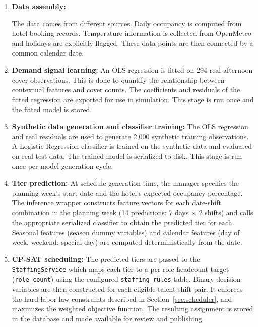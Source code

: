 \documentclass[12pt,a4paper,oneside]{article}
\begin{document}
\begin{enumerate}
    \item \textbf{Data assembly:} 
    
    The data comes from different sources. Daily occupancy is computed from hotel booking records. Temperature information is collected from OpenMeteo and holidays are explicitly flagged. These data points are then connected by a common calendar date. 

    \item \textbf{Demand signal learning:} An OLS regression is fitted on 294 real afternoon cover observations. This is done to quantify the relationship between contextual features and cover counts. The coefficients and residuals of the fitted regression are exported for use in simulation. This stage is run once and the fitted model is stored.

    \item \textbf{Synthetic data generation and classifier training:} The OLS regression and real residuals are used to generate 2,000 synthetic training observations. A Logistic Regression classifier is trained on the synthetic data and evaluated on real test data. The trained model is serialized to disk. This stage is run once per model generation cycle.

    \item \textbf{Tier prediction:} At schedule generation time, the manager specifies the planning week's start date and the hotel's expected occupancy percentage. The inference wrapper constructs feature vectors for each date-shift combination in the planning week (14 predictions: 7 days $\times$ 2 shifts) and calls the appropriate serialized classifier to obtain the predicted tier for each. Seasonal features (season dummy variables) and calendar features (day of week, weekend, special day) are computed deterministically from the date.

    \item \textbf{CP-SAT scheduling:} The predicted tiers are passed to the \texttt{StaffingService} which maps each tier to a per-role headcount target (\texttt{role\_count}) using the configured \texttt{staffing\_rules} table. Binary decision variables are then constructed for each eligible talent-shift pair. It enforces the hard labor law constraints described in Section~\ref{sec:scheduler}, and maximizes the weighted objective function. The resulting assignment is stored in the database and made available for review and publishing.
\end{enumerate}
\end{document}
